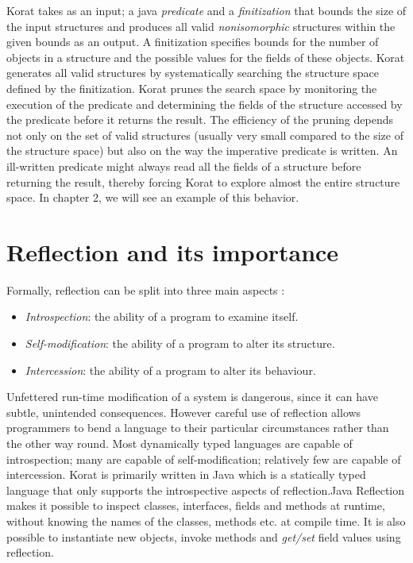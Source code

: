 \para
Korat takes as an input; a java \emph{predicate} and a \emph{finitization} that bounds the size of the input structures and produces all valid \emph{nonisomorphic} structures within the given bounds as an output. A finitization specifies bounds for the number of objects in a structure and the possible values for the fields of these objects. Korat generates all valid structures by systematically searching the structure space defined by the finitization. Korat prunes the search space by monitoring the execution of the predicate and determining the fields of the structure accessed by the predicate before it returns the result. The efficiency of the pruning depends not only on the set of valid structures (usually very small compared to the size of the structure space) but also on the way the imperative predicate is written. An ill-written predicate might always read all the fields of a structure before returning the result, thereby forcing Korat to explore almost the entire structure space. In chapter 2, we will see an example of this behavior.


\section{Reflection and its importance}
\noindent Formally, reflection can be split into three main aspects \cite{bracha2004mirrors,mostinckx2009mirror}:
\begin{itemize}
\item \emph{Introspection}: the ability of a program to examine itself.
\item \emph{Self-modification}: the ability of a program to alter its structure.
\item \emph{Intercession}: the ability of a program to alter its behaviour.
\end{itemize}

\para
Unfettered run-time modification of a system is dangerous, since it can have subtle, unintended consequences. However careful use of reflection allows programmers to bend a language to their particular circumstances rather than the other way round. Most dynamically typed languages are capable of introspection; many are capable of self-modification; relatively few are capable of intercession. Korat is primarily written in Java which is a statically typed language that only supports the introspective \cite{maes1987concepts} aspects of reflection.Java Reflection makes it possible to inspect classes, interfaces, fields and methods at runtime, without knowing the names of the classes, methods etc. at compile time. It is also possible to instantiate new objects, invoke methods and \emph{get/set} field values using reflection.

